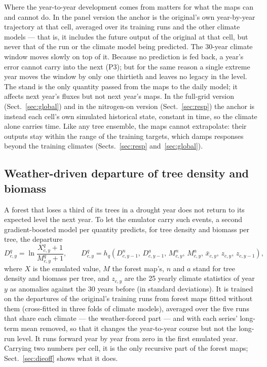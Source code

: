 \documentclass[11pt,a4paper]{article}
\begin{document}
Where the year-to-year development comes from matters for what the maps can and cannot do. In the panel version the
anchor is the original's own year-by-year trajectory at that cell, averaged over its training runs and the other
climate models --- that is, it includes the future output of the original at that cell, but never that of the run or
the climate model being predicted. The 30-year climate window moves slowly on top of it. Because no prediction is fed
back, a year's error cannot carry into the next (P3); but for the same reason a single extreme year moves the window by
only one thirtieth and leaves no legacy in the level. The stand is the only quantity passed from the maps to the daily
model; it affects next year's fluxes but not next year's maps. In the full-grid version (Sect.~\ref{sec:global}) and in
the nitrogen-on version (Sect.~\ref{sec:resp}) the anchor is instead each cell's own simulated historical state,
constant in time, so the climate alone carries time. Like any tree ensemble, the maps cannot extrapolate: their
outputs stay within the range of the training targets, which damps responses beyond the training climates
(Sects.~\ref{sec:resp} and~\ref{sec:global}).

\subsection{Weather-driven departure of tree density and biomass}\label{sec:dep}

A forest that loses a third of its trees in a drought year does not return to its expected level the next year. To let
the emulator carry such events, a second gradient-boosted model per quantity predicts, for tree density and biomass per
tree, the departure
\begin{equation}
  D^{q}_{c,y} = \ln\frac{X^{q}_{c,y}+1}{M^{q}_{c,y}+1},\qquad
  D^{q}_{c,y} = h_q\!\left(D^{n}_{c,y-1},\, D^{a}_{c,y-1},\, M^{n}_{c,y},\, M^{a}_{c,y},\, \bar{x}_{c,y},\,
  z_{c,y},\, z_{c,y-1}\right),
\end{equation}
where $X$ is the emulated value, $M$ the forest map's, $n$ and $a$ stand for tree density and biomass per tree, and
$z_{c,y}$ are the 25 yearly climate statistics of year $y$ as anomalies against the 30 years before (in standard
deviations). It is trained on the departures of the original's training runs from forest maps fitted without them
(cross-fitted in three folds of climate models), averaged over the five runs that share each climate --- the
weather-forced part --- and with each series' long-term mean removed, so that it changes the year-to-year course but
not the long-run level. It runs forward year by year from zero in the first emulated year. Carrying two numbers per
cell, it is the only recursive part of the forest maps; Sect.~\ref{sec:dieoff} shows what it does.
\end{document}
